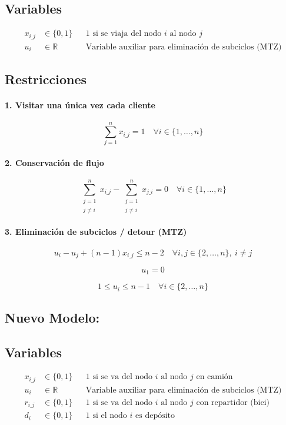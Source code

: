 \documentclass{article}
\begin{document}
    \subsection*{Variables}
    \begin{align*}
        x_{i\_j} &\in \{0,1\} && \text{1 si se viaja del nodo } i \text{ al nodo } j \\
        u_i &\in \mathbb{R} && \text{Variable auxiliar para eliminación de subciclos (MTZ)}
    \end{align*}
    
    \subsection*{Restricciones}
    
    \paragraph{1. Visitar una única vez cada cliente}
    \[
    \sum_{j=1}^{n} x_{i\_j} = 1 \quad \forall i \in \{1, \dots, n\}
    \]
    
    \paragraph{2. Conservación de flujo}
    \[
    \sum_{\substack{j=1 \\ j \ne i}}^{n} x_{i\_j} - \sum_{\substack{j=1 \\ j \ne i}}^{n} x_{j\_i} = 0 \quad \forall i \in \{1, \dots, n\}
    \]
    
    \paragraph{3. Eliminación de subciclos / detour (MTZ)}
    \[
    u_i - u_j + (n - 1)x_{i\_j} \leq n - 2 \quad \forall i, j \in \{2, \dots, n\},\ i \ne j
    \]
    
    \[
    u_1 = 0
    \]
    
    \[
    1 \leq u_i \leq n - 1 \quad \forall i \in \{2, \dots, n\}
    \]
    
    \subsection{Nuevo Modelo:} \label{model_repartidores}
    \subsection*{Variables}
    \begin{align*}
        x_{i\_j} &\in \{0,1\} && \text{1 si se va del nodo } i \text{ al nodo } j \text{ en camión }\\
        u_i &\in \mathbb{R} && \text{Variable auxiliar para eliminación de subciclos (MTZ)} \\
        r_{i\_j} &\in \{0,1\} && \text{1 si se va del nodo } i \text{ al nodo } j \text{ con repartidor (bici) } \\
        d_{i} &\in \{0,1\} && \text{1 si el nodo $i$ es depósito } 
    \end{align*}
    
\end{document}

